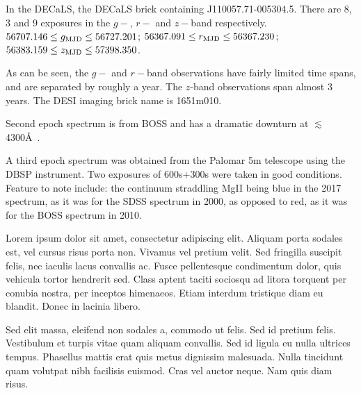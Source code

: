 \documentclass{emulateapj}
\begin{document}
In the DECaLS, the DECaLS brick containing J110057.71-005304.5.
There are 8, 3 and 9 exposures in the $g-$, $r-$ and $z-$band 
respectively. 
$56707.146 \leq g_{\rm MJD} \leq  56727.201$;  
$56367.091 \leq  r_{\rm MJD} \leq  56367.230$; 
$56383.159 \leq  z_{\rm MJD} \leq  57398.350$. 

As can be seen, the $g-$ and $r-$band observations have fairly limited
time spans, and are separated by roughly a year. The $z$-band
observations span almost 3 years.  The DESI imaging brick name is
1651m010.

Second epoch spectrum is from BOSS and has a dramatic downturn at 
$\lesssim$4300\AA\ . 

A third epoch spectrum was obtained from the Palomar 5m 
telescope using the DBSP instrument. 
Two exposures of 600s+300s were taken in good conditions. 
Feature to note include: the continuum straddling MgII
being blue in the 2017 spectrum, as it was for the SDSS spectrum in 2000, as opposed to
red, as it was for the BOSS spectrum in 2010.  

Lorem ipsum dolor sit amet, consectetur adipiscing elit. Aliquam porta
sodales est, vel cursus risus porta non. Vivamus vel pretium
velit. Sed fringilla suscipit felis, nec iaculis lacus convallis
ac. Fusce pellentesque condimentum dolor, quis vehicula tortor
hendrerit sed. Class aptent taciti sociosqu ad litora torquent per
conubia nostra, per inceptos himenaeos. Etiam interdum tristique diam
eu blandit. Donec in lacinia libero.

Sed elit massa, eleifend non sodales a, commodo ut felis. Sed id
pretium felis. Vestibulum et turpis vitae quam aliquam convallis. Sed
id ligula eu nulla ultrices tempus. Phasellus mattis erat quis metus
dignissim malesuada. Nulla tincidunt quam volutpat nibh facilisis
euismod. Cras vel auctor neque. Nam quis diam risus.
\end{document}
